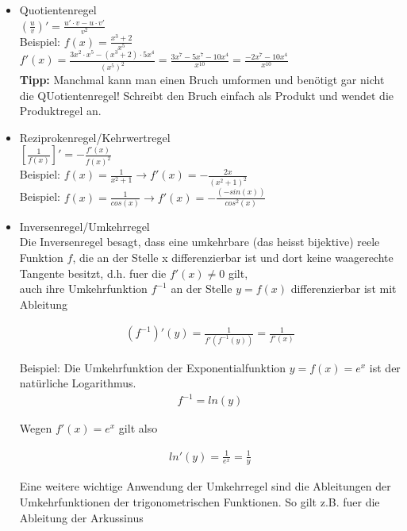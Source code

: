 \documentclass[a4paper]{article}
\begin{document}
\begin{itemize}
	\item Quotientenregel\\
	$(\frac{u}{v})' = \frac{u' \cdot v - u \cdot v'}{v^2}$\\
	Beispiel: $f(x) = \frac{x^3 + 2}{x^5}$\\
	$f'(x) = \frac{3x^2 \cdot x^5 - (x^3 + 2) \cdot 5x^4}{(x^5)^2} = \frac{3x^7 - 5x^7 - 10x^4}{x^{10}} = \frac{-2x^7 - 10x^4}{x^{10}}$\\
	
	\textbf{Tipp:} Manchmal kann man einen Bruch umformen und benötigt gar nicht die QUotientenregel! Schreibt den Bruch einfach als Produkt und wendet die Produktregel an.
	\item Reziprokenregel/Kehrwertregel\\
	
	$\left[ \frac{1}{f(x)}\right]' = - \frac{f'(x)}{f(x)^2}$\\
	Beispiel: $f(x) = \frac{1}{x^2 + 1} \rightarrow f'(x) = - \frac{2x}{(x^2 + 1)^2}$\\
	Beispiel: $f(x) = \frac{1}{cos(x)} \rightarrow f'(x) = - \frac{(-sin(x))}{cos^2(x)}$
	\item Inversenregel/Umkehrregel\\
	
	Die Inversenregel besagt, dass eine umkehrbare (das heisst bijektive) reele Funktion $f$, die an der Stelle x differenzierbar ist und dort keine waagerechte Tangente besitzt, d.h. fuer die $f'(x) \neq 0$ gilt,\\
	auch ihre Umkehrfunktion $f^{-1}$ an der Stelle $y = f(x)$ differenzierbar ist mit Ableitung
	
	\begin{align*}
		(f^{-1})'(y) = \frac{1}{f'(f^{-1}(y))} = \frac{1}{f'(x)}
	\end{align*}
	
Beispiel: Die Umkehrfunktion der Exponentialfunktion $y = f(x) = e^x$ ist der natürliche Logarithmus.\\

\begin{align*}
	f^{-1} = ln(y)
\end{align*}

Wegen $f'(x) = e^x$ gilt also

\begin{align*}
	ln'(y) = \frac{1}{e^x} = \frac{1}{y}
\end{align*}

Eine weitere wichtige Anwendung der Umkehrregel sind die Ableitungen der Umkehrfunktionen der trigonometrischen Funktionen. So gilt z.B. fuer die Ableitung der Arkussinus


\end{itemize}
\end{document}
